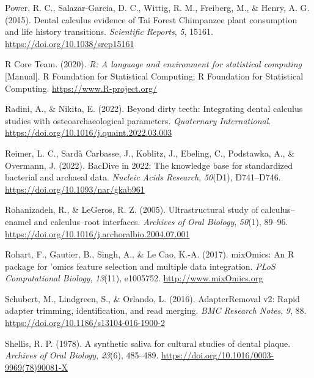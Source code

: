 \documentclass[
]{article}
\newlength{\cslhangindent}
\newlength{\cslentryspacingunit} %
\newenvironment{CSLReferences}[2] %
 {%
  \setlength{\parindent}{0pt}
  \ifodd #1
  \let\oldpar\par
  \def\par{\hangindent=\cslhangindent\oldpar}
  \fi
  \setlength{\parskip}{#2\cslentryspacingunit}
 }%
 {}
\begin{document}
\begin{CSLReferences}{1}{0}
\leavevmode{}%
Power, R. C., Salazar-Garcia, D. C., Wittig, R. M., Freiberg, M., \&
Henry, A. G. (2015). Dental calculus evidence of {Tai Forest Chimpanzee}
plant consumption and life history transitions. \emph{Scientific
Reports}, \emph{5}, 15161. \url{https://doi.org/10.1038/srep15161}

\leavevmode{}%
R Core Team. (2020). \emph{R: {A} language and environment for
statistical computing} {[}Manual{]}. {R Foundation for Statistical
Computing}; {R Foundation for Statistical Computing}.
\url{https://www.R-project.org/}

\leavevmode{}%
Radini, A., \& Nikita, E. (2022). Beyond dirty teeth: {Integrating}
dental calculus studies with osteoarchaeological parameters.
\emph{Quaternary International}.
\url{https://doi.org/10.1016/j.quaint.2022.03.003}

\leavevmode{}%
Reimer, L. C., Sardà Carbasse, J., Koblitz, J., Ebeling, C., Podstawka,
A., \& Overmann, J. (2022). {BacDive} in 2022: The knowledge base for
standardized bacterial and archaeal data. \emph{Nucleic Acids Research},
\emph{50}(D1), D741--D746. \url{https://doi.org/10.1093/nar/gkab961}

\leavevmode{}%
Rohanizadeh, R., \& LeGeros, R. Z. (2005). Ultrastructural study of
calculus--enamel and calculus--root interfaces. \emph{Archives of Oral
Biology}, \emph{50}(1), 89--96.
\url{https://doi.org/10.1016/j.archoralbio.2004.07.001}

\leavevmode{}%
Rohart, F., Gautier, B., Singh, A., \& Le Cao, K.-A. (2017). {mixOmics}:
{An R} package for 'omics feature selection and multiple data
integration. \emph{PLoS Computational Biology}, \emph{13}(11), e1005752.
\url{http://www.mixOmics.org}

\leavevmode{}%
Schubert, M., Lindgreen, S., \& Orlando, L. (2016). {AdapterRemoval} v2:
Rapid adapter trimming, identification, and read merging. \emph{BMC
Research Notes}, \emph{9}, 88.
\url{https://doi.org/10.1186/s13104-016-1900-2}

\leavevmode{}%
Shellis, R. P. (1978). A synthetic saliva for cultural studies of dental
plaque. \emph{Archives of Oral Biology}, \emph{23}(6), 485--489.
\url{https://doi.org/10.1016/0003-9969(78)90081-X}


\end{CSLReferences}
\end{document}
